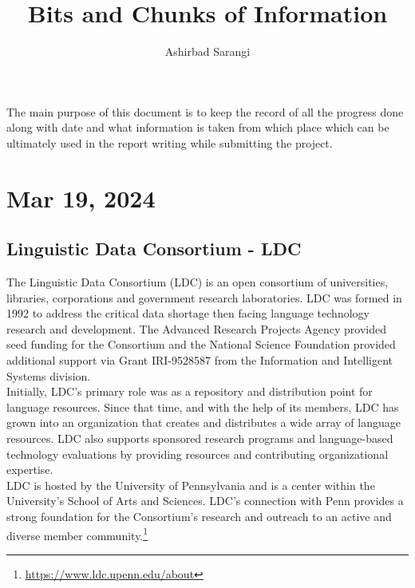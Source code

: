 \documentclass[a4paper, 12pt]{article}
\title{Bits and Chunks of Information}
\author{Ashirbad Sarangi}
\date{}
\begin{document}
\maketitle

\begin{multicols}{2}
	The main purpose of this document is to keep the record of all the progress done along with date and what information is taken from which place which can be ultimately used in the report writing while submitting the project.

	\section{Mar 19, 2024}
	\subsection{Linguistic Data Consortium - LDC}
	The Linguistic Data Consortium (LDC) is an open consortium of universities, libraries, corporations and government research laboratories. LDC was formed in 1992 to address the critical data shortage then facing language technology research and development. The Advanced Research Projects Agency provided seed funding for the Consortium and the National Science Foundation provided additional support via Grant IRI-9528587 from the Information and Intelligent Systems division. \\ Initially, LDC's primary role was as a repository and distribution point for language resources. Since that time, and with the help of its members, LDC has grown into an organization that creates and distributes a wide array of language resources. LDC also supports sponsored research programs and language-based technology evaluations by providing resources and contributing organizational expertise. \\ LDC is hosted by the University of Pennsylvania and is a center within the University’s School of Arts and Sciences. LDC’s connection with Penn provides a strong foundation for the Consortium’s research and outreach to an active and diverse member community.\footnote{\url{https://www.ldc.upenn.edu/about}}


\end{multicols}
\end{document}
